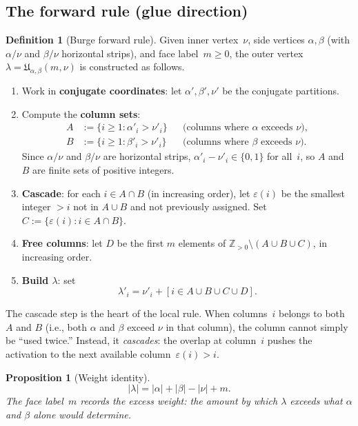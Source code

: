 \documentclass[11pt]{article}
\newcommand{\Z}{\mathbb{Z}}
\theoremstyle{plain}
\newtheorem{proposition}[theorem]{Proposition}
\theoremstyle{definition}
\newtheorem{definition}[theorem]{Definition}
\begin{document}
\subsection{The forward rule (glue direction)}
\label{sec:forward}

\begin{definition}[Burge forward rule]
\label{def:forward}
Given inner vertex~$\nu$, side vertices $\alpha, \beta$ (with
$\alpha/\nu$ and $\beta/\nu$ horizontal strips), and face
label~$m \geq 0$, the outer vertex
$\lambda = \mathfrak{U}_{\alpha,\beta}(m, \nu)$ is constructed as
follows.
\begin{enumerate}
  \item Work in \textbf{conjugate coordinates}: let $\alpha', \beta',
    \nu'$ be the conjugate partitions.
  \item Compute the \textbf{column sets}:
    \begin{align*}
      A &:= \{i \geq 1 : \alpha'_i > \nu'_i\}
        & &\text{(columns where $\alpha$ exceeds $\nu$)}, \\
      B &:= \{i \geq 1 : \beta'_i > \nu'_i\}
        & &\text{(columns where $\beta$ exceeds $\nu$)}.
    \end{align*}
    Since $\alpha/\nu$ and $\beta/\nu$ are horizontal strips,
    $\alpha'_i - \nu'_i \in \{0,1\}$ for all~$i$, so
    $A$ and $B$ are finite sets of positive integers.
  \item \textbf{Cascade}: for each $i \in A \cap B$ (in increasing
    order), let $\varepsilon(i)$ be the smallest integer $> i$ not in
    $A \cup B$ and not previously assigned.  Set
    $C := \{\varepsilon(i) : i \in A \cap B\}$.
  \item \textbf{Free columns}: let $D$ be the first $m$ elements of
    $\Z_{>0} \setminus (A \cup B \cup C)$, in increasing order.
  \item \textbf{Build $\lambda$}: set
    \[
      \lambda'_i = \nu'_i + [i \in A \cup B \cup C \cup D].
    \]
\end{enumerate}
\end{definition}

The cascade step is the heart of the local rule.  When columns~$i$
belongs to both $A$ and $B$ (i.e., both $\alpha$ and $\beta$ exceed
$\nu$ in that column), the column cannot simply be ``used twice.''
Instead, it \emph{cascades}: the overlap at column~$i$ pushes the
activation to the next available column~$\varepsilon(i) > i$.

\begin{proposition}[Weight identity]
\label{prop:weight}
\begin{equation}\label{eq:weight}
  |\lambda| = |\alpha| + |\beta| - |\nu| + m.
\end{equation}
The face label~$m$ records the \emph{excess weight}: the amount by
which $\lambda$ exceeds what $\alpha$ and $\beta$ alone would
determine.
\end{proposition}
\end{document}
